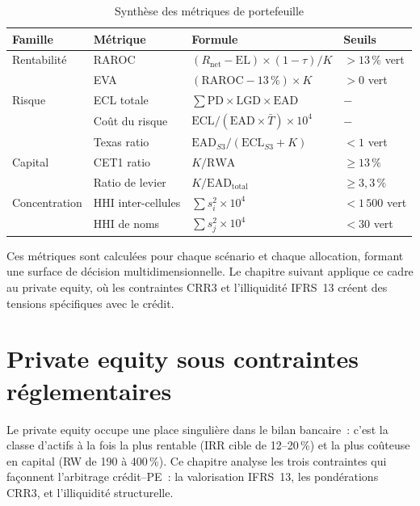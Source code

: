 \documentclass[12pt, a4paper, twoside, openright]{report}
\theoremstyle{definition}
\begin{document}
\begin{table}[htbp]
\centering
\caption{Synthèse des métriques de portefeuille}
\label{tab:metriques-synthese}
\small
\begin{tabular}{llll}
\toprule
Famille & Métrique & Formule & Seuils \\
\midrule
Rentabilité & RAROC & $(R_{\text{net}} - \text{EL}) \times (1-\tau) / K$ & $> 13\,\%$ vert \\
 & EVA & $(\text{RAROC} - 13\,\%) \times K$ & $> 0$ vert \\
\midrule
Risque & ECL totale & $\sum \text{PD} \times \text{LGD} \times \text{EAD}$ & $-$ \\
 & Coût du risque & $\text{ECL} / (\text{EAD} \times \bar{T}) \times 10^4$ & $-$ \\
 & Texas ratio & $\text{EAD}_{S3} / (\text{ECL}_{S3} + K)$ & $< 1$ vert \\
\midrule
Capital & CET1 ratio & $K / \text{RWA}$ & $\geq 13\,\%$ \\
 & Ratio de levier & $K / \text{EAD}_{\text{total}}$ & $\geq 3{,}3\,\%$ \\
\midrule
Concentration & HHI inter-cellules & $\sum s_i^2 \times 10^4$ & $< 1\,500$ vert \\
 & HHI de noms & $\sum s_j^2 \times 10^4$ & $< 30$ vert \\
\bottomrule
\end{tabular}
\end{table}

Ces métriques sont calculées pour chaque scénario et chaque allocation, formant une surface de décision multidimensionnelle. Le chapitre suivant applique ce cadre au private equity, où les contraintes CRR3 et l'illiquidité IFRS~13 créent des tensions spécifiques avec le crédit.


\chapter{Private equity sous contraintes réglementaires}
\label{chap:pe}

Le private equity occupe une place singulière dans le bilan bancaire~: c'est la classe d'actifs à la fois la plus rentable (IRR cible de 12--20\,\%) et la plus coûteuse en capital (RW de 190 à 400\,\%). Ce chapitre analyse les trois contraintes qui façonnent l'arbitrage crédit--PE~: la valorisation IFRS~13, les pondérations CRR3, et l'illiquidité structurelle.
\end{document}
